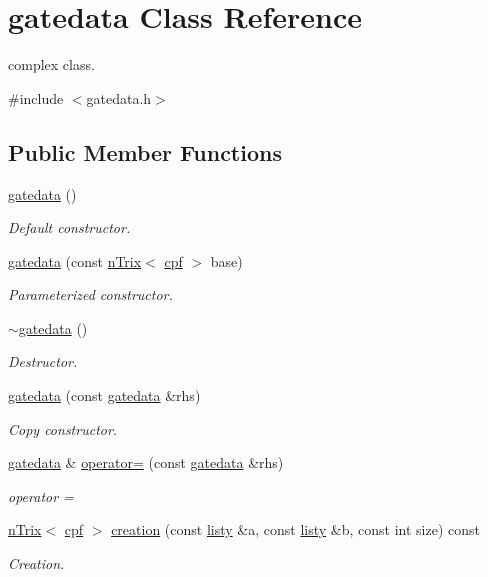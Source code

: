\hypertarget{classgatedata}{}\section{gatedata Class Reference}
\label{classgatedata}


complex class.  




{\ttfamily \#include $<$gatedata.\+h$>$}

\subsection*{Public Member Functions}
\begin{DoxyCompactItemize}
\item 
\hyperlink{classgatedata_aa0a4c028ee7d4a4c48751e8a513cb948}{gatedata} ()
\begin{DoxyCompactList}\small\item\em Default constructor. \end{DoxyCompactList}\item 
\hyperlink{classgatedata_afdcaaf74830567350d29308b79d80063}{gatedata} (const \hyperlink{classnTrix}{n\+Trix}$<$ \hyperlink{gatedata_8h_a0c9667bfe3ded0fa2cd4fab281edbe24}{cpf} $>$ base)
\begin{DoxyCompactList}\small\item\em Parameterized constructor. \end{DoxyCompactList}\item 
\hyperlink{classgatedata_a082f33e892b7fd081d0d1c209306f522}{$\sim$gatedata} ()
\begin{DoxyCompactList}\small\item\em Destructor. \end{DoxyCompactList}\item 
\hyperlink{classgatedata_a71d1a00b05856567e2434e6e660c84ef}{gatedata} (const \hyperlink{classgatedata}{gatedata} \&rhs)
\begin{DoxyCompactList}\small\item\em Copy constructor. \end{DoxyCompactList}\item 
\hyperlink{classgatedata}{gatedata} \& \hyperlink{classgatedata_ab6386ea952bb7e620136049a5bd61211}{operator=} (const \hyperlink{classgatedata}{gatedata} \&rhs)
\begin{DoxyCompactList}\small\item\em operator = \end{DoxyCompactList}\item 
\hyperlink{classnTrix}{n\+Trix}$<$ \hyperlink{gatedata_8h_a0c9667bfe3ded0fa2cd4fab281edbe24}{cpf} $>$ \hyperlink{classgatedata_a593ada3b478c7045f001d07c1ecd95ca}{creation} (const \hyperlink{gatedata_8h_abecce716fb2428607e7c6cc3343d6c92}{listy} \&a, const \hyperlink{gatedata_8h_abecce716fb2428607e7c6cc3343d6c92}{listy} \&b, const int size) const
\begin{DoxyCompactList}\small\item\em Creation. \end{DoxyCompactList}\end{DoxyCompactItemize}


